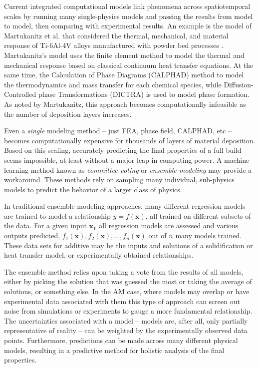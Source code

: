 Current integrated computational models link phenomena across spatiotemporal scales by running many single-physics models and passing the results from model to model, then comparing with experimental results. An example is the model of Martukanitz et al. that considered the thermal, mechanical, and material response of Ti-6Al-4V alloys manufactured with powder bed processes \cite{Martukanitz2014}. Martukanitz's model uses the finite element method to model the thermal and mechanical response based on classical continuum heat transfer equations. At the same time, the Calculation of Phase Diagrams (CALPHAD) method to model the thermodynamics and mass transfer for each chemical species, while Diffusion-Controlled phase Transformations (DICTRA) is used to model phase formation. As noted by Martukanitz, this approach becomes computationally infeasible as the number of deposition layers increases.

Even a \textit{single} modeling method -- just FEA, phase field, CALPHAD, etc -- becomes computationally expensive for thousands of layers of material deposition. Based on this scaling, accurately predicting the final properties of a full build seems impossible, at least without a major leap in computing power. A machine learning method known as \textit{committee voting} or \textit{ensemble modeling} may provide a workaround. These methods rely on sampling many individual, sub-physics models to predict the behavior of a larger class of physics.

In traditional ensemble modeling approaches, many different regression models are trained to model a relationship $y = f(\mathbf{x})$, all trained on different subsets of the data. For a given input $\mathbf{x_1}$ all regression models are assessed and various outputs predicted, $f_1(\mathbf{x}), f_2(\mathbf{x}), ..., f_n(\mathbf{x})$ out of $n$ many models trained. These data sets for additive may be the inputs and solutions of a solidification or heat transfer model, or experimentally obtained relationships.

The ensemble method relies upon taking a vote from the results of all models, either by picking the solution that was guessed the most or taking the average of solutions, or something else. In the AM case, where models may overlap or have experimental data associated with them this type of approach can screen out noise from simulations or experiments to gauge a more fundamental relationship. The uncertainties associated with a model -- models are, after all, only partially representative of reality -- can be weighted by the experimentally observed data points. Furthermore, predictions can be made across many different physical models, resulting in a predictive method for holistic analysis of the final properties.

